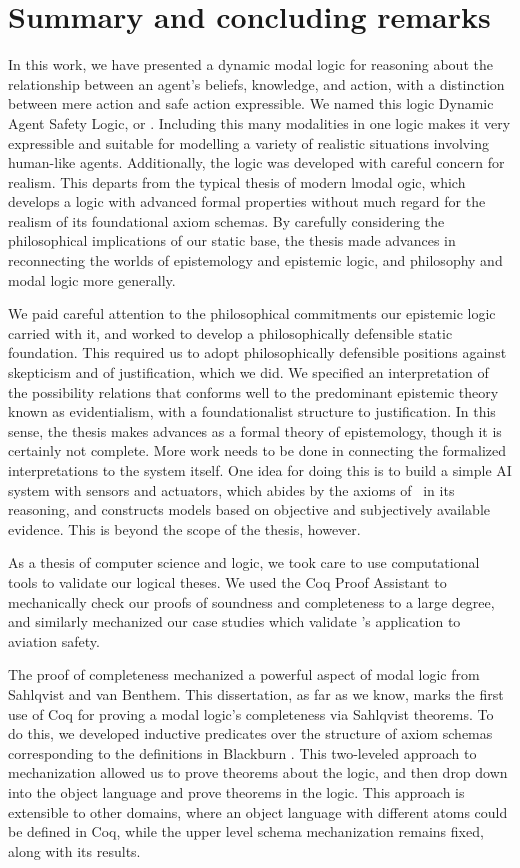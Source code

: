 \chapter{Summary and concluding remarks}
	\label{CH_summary}

In this work, we have presented a dynamic modal logic for reasoning about the relationship between an agent's beliefs, knowledge, and action, with a distinction between mere action and safe action expressible. We named this logic Dynamic Agent Safety Logic, or \DASL. Including this many modalities in one logic makes it very expressible and suitable for modelling a variety of realistic situations involving human-like agents. Additionally, the logic was developed with careful concern for realism. This departs from the typical thesis of modern lmodal ogic, which develops a logic with advanced formal properties without much regard for the realism of its foundational axiom schemas. By carefully considering the philosophical implications of our static base, the thesis made advances in reconnecting the worlds of epistemology and epistemic logic, and philosophy and modal logic more generally.

We paid careful attention to the philosophical commitments our epistemic logic carried with it, and worked to develop a philosophically defensible static foundation. This required us to adopt philosophically defensible positions against skepticism and of justification, which we did. We specified an interpretation of the possibility relations that conforms well to the predominant epistemic theory known as evidentialism, with a foundationalist structure to justification. In this sense, the thesis makes advances as a formal theory of epistemology, though it is certainly not complete. More work needs to be done in connecting the formalized interpretations to the system itself. One idea for doing this is to build a simple AI system with sensors and actuators, which abides by the axioms of \DASL\ in its reasoning, and constructs models based on objective and subjectively available evidence. This is beyond the scope of the thesis, however.

As a thesis of computer science and logic, we took care to use computational tools to validate our logical theses. We used the Coq Proof Assistant to mechanically check our proofs of soundness and completeness to a large degree, and similarly mechanized our case studies which validate \DASL's application to aviation safety. 

The proof of completeness mechanized a powerful aspect of modal logic from Sahlqvist and van Benthem. This dissertation, as far as we know, marks the first use of Coq for proving a modal logic's completeness via Sahlqvist theorems. To do this, we developed inductive predicates over the structure of axiom schemas corresponding to the definitions in Blackburn \etal\cite{modal}. This two-leveled approach to mechanization allowed us to prove theorems about the logic, and then drop down into the object language and prove theorems in the logic. This approach is extensible to other domains, where an object language with different atoms could be defined in Coq, while the upper level schema mechanization remains fixed, along with its results.

